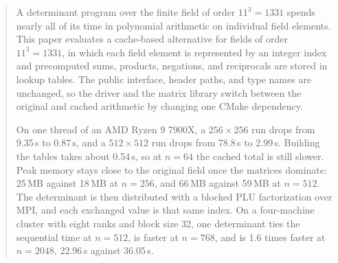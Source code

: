 \begin{abstract}
A determinant program over the finite field of order \(11^3 = 1331\) spends nearly all of its time in polynomial arithmetic on individual field elements.
This paper evaluates a cache-based alternative for fields of order \(11^3 = 1331\), in which each field element is represented by an integer index and precomputed sums, products, negations, and reciprocals are stored in lookup tables.
The public interface, header paths, and type names are unchanged, so the driver and the matrix library switch between the original and cached arithmetic by changing one CMake dependency.

On one thread of an AMD Ryzen 9 7900X, a \(256 \times 256\) run drops from 9.35\,s to 0.87\,s, and a \(512 \times 512\) run drops from 78.8\,s to 2.99\,s.
Building the tables takes about 0.54\,s, so at \(n = 64\) the cached total is still slower.
Peak memory stays close to the original field once the matrices dominate: 25\,MB against 18\,MB at \(n = 256\), and 66\,MB against 59\,MB at \(n = 512\).
The determinant is then distributed with a blocked PLU factorization over MPI, and each exchanged value is that same index.
On a four-machine cluster with eight ranks and block size 32, one determinant ties the sequential time at \(n = 512\), is faster at \(n = 768\), and is 1.6 times faster at \(n = 2048\), 22.96\,s against 36.05\,s.
\end{abstract}
